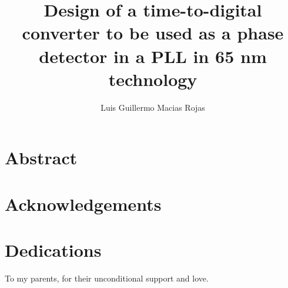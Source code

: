 \documentclass[twoside, 12pt]{report}   %
\title{Design of a time-to-digital converter to be used as a phase detector in a PLL in 65 nm technology}
\author{Luis Guillermo Macias Rojas}
\theoremstyle{mytheoremstyle}
\theoremstyle{mytheoremstyle}
\theoremstyle{myproblemstyle}
\begin{document}
    \maketitle

    \selectfont %
    \chapter*{Abstract}
    \lipsum[1]
    \chapter*{Acknowledgements}
    \lipsum[2]
    \chapter*{Dedications}
    To my parents, for their unconditional support and love.
    \chapter*{}
    \tableofcontents
    \listoffigures
    \listoftables

    
    
    
    
    
    
    

    \printbibliography  %
\end{document}
